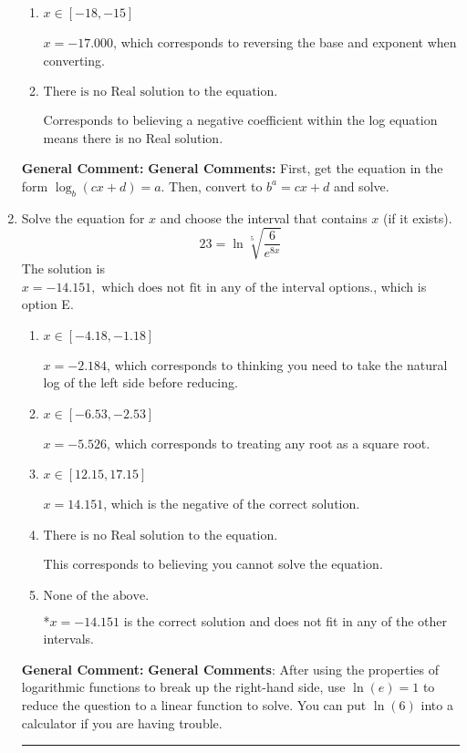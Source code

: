 \documentclass{extbook}[14pt]
\newcommand{\litem}[1]{\item #1

\rule{\textwidth}{0.4pt}}
\begin{document}
\begin{enumerate}
{\begin{enumerate}[label=\Alph*.]
* $x = -3.481$, which is the correct option.
\item \( x \in [-18, -15] \)

$x = -17.000$, which corresponds to reversing the base and exponent when converting.
\item \( \text{There is no Real solution to the equation.} \)

Corresponds to believing a negative coefficient within the log equation means there is no Real solution.
\end{enumerate}

\textbf{General Comment:} \textbf{General Comments:} First, get the equation in the form $\log_b{(cx+d)} = a$. Then, convert to $b^a = cx+d$ and solve.
}
\litem{
 Solve the equation for $x$ and choose the interval that contains $x$ (if it exists).
\[  23 = \ln{\sqrt[5]{\frac{6}{e^{8x}}}} \]The solution is \( x = -14.151, \text{ which does not fit in any of the interval options.} \), which is option E.\begin{enumerate}[label=\Alph*.]
\item \( x \in [-4.18, -1.18] \)

$x = -2.184$, which corresponds to thinking you need to take the natural log of the left side before reducing.
\item \( x \in [-6.53, -2.53] \)

$x = -5.526$, which corresponds to treating any root as a square root.
\item \( x \in [12.15, 17.15] \)

$x = 14.151$, which is the negative of the correct solution.
\item \( \text{There is no Real solution to the equation.} \)

This corresponds to believing you cannot solve the equation.
\item \( \text{None of the above.} \)

*$x = -14.151$ is the correct solution and does not fit in any of the other intervals.
\end{enumerate}

\textbf{General Comment:} \textbf{General Comments}: After using the properties of logarithmic functions to break up the right-hand side, use $\ln(e) = 1$ to reduce the question to a linear function to solve. You can put $\ln(6)$ into a calculator if you are having trouble.
}
\end{enumerate}
\end{document}
